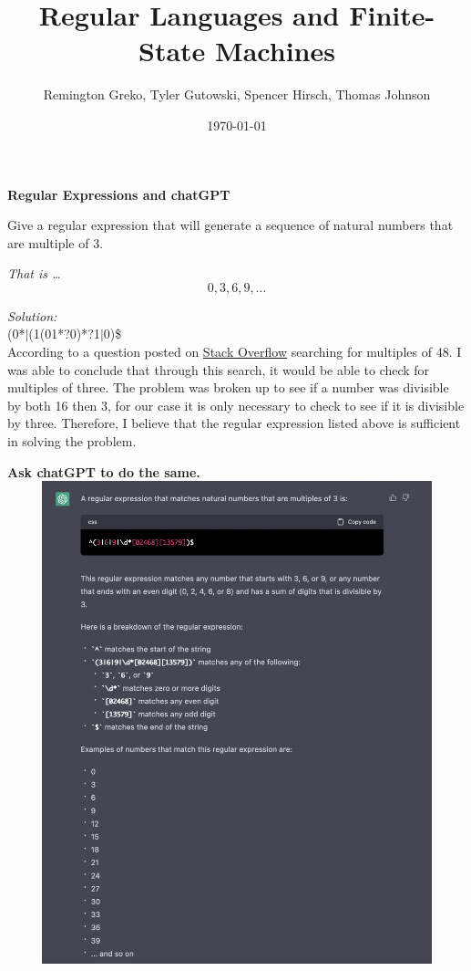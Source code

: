 \documentclass{article}
\begin{document}
\title{Regular Languages and Finite-State Machines}
\author{Remington Greko, Tyler Gutowski, Spencer Hirsch, Thomas Johnson}
\date{\today}

\maketitle

\textbf{Regular Expressions and chatGPT}

Give a regular expression that will generate a sequence of natural numbers
that are multiple of 3.

\textit{That is \dots}
\[0, 3, 6, 9, \dots \]

\medskip

\noindent \textit{Solution:} \\
$\hat{}$(0*$\mid$(1(01*?0)*?1$\mid$0)\$ \\

According to a question posted on \href{https://stackoverflow.com/questions/4518307/can-i-use-regular-expressions-to-search-for-multiples-of-a-number}{Stack Overflow}
searching for multiples of 48. I was able to conclude that through this search, it would be able to check for multiples of three.
The problem was broken up to see if a number was divisible by both 16 then 3, for our case it is only necessary to check to see if
it is divisible by three. Therefore, I believe that the regular expression listed above is sufficient in solving the problem.

\pagebreak

\textbf{Ask chatGPT to do the same.} \\

\includegraphics[width=15cm,height=14cm]{chat} \\

\medskip
\end{document}
